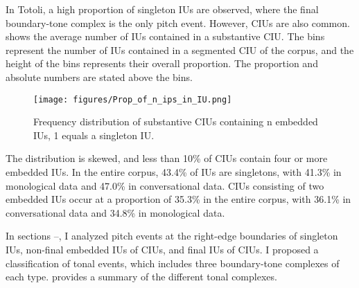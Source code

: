 In Totoli, a high proportion of singleton IUs are observed, where the final boundary-tone complex is the only pitch event. However, CIUs are also common.   shows the average number of IUs contained in a substantive CIU. The bins represent the number of IUs contained in a segmented CIU of the corpus, and the height of the bins represents their overall proportion. The proportion and absolute numbers are stated above the bins.


\begin{figure}
	\texttt{[image: figures/Prop\_of\_n\_ips\_in\_IU.png]}
	\caption{Frequency distribution of substantive CIUs containing n embedded IUs, 1 equals a singleton IU.}
	\label{Length and Number ips}
\end{figure}




The distribution is skewed, and less than 10\% of CIUs contain four or more embedded IUs. In the entire corpus, 43.4\% of IUs are singletons, with 41.3\% in monological data and 47.0\% in conversational data. CIUs consisting of two embedded IUs occur at a proportion of 35.3\% in the entire corpus, with 36.1\% in conversational data and 34.8\% in monological data.




In sections --, I analyzed pitch events at the right-edge boundaries of singleton IUs, non-final embedded IUs of CIUs, and final IUs of CIUs. I proposed a classification of tonal events, which includes three boundary-tone complexes of each type.   provides a summary of the different tonal complexes.


